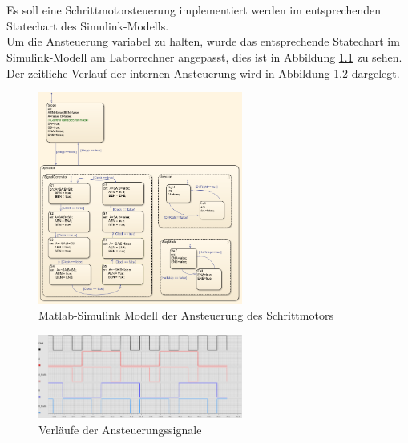 \chapter{}\label{ch:aufg6}

Es soll eine Schrittmotorsteuerung implementiert werden im entsprechenden Statechart des Simulink-Modells. \\
Um die Ansteuerung variabel zu halten, wurde das entsprechende Statechart im Simulink-Modell am Laborrechner angepasst, dies ist in Abbildung \ref{fig:6:simulink} zu sehen. Der zeitliche Verlauf der internen Ansteuerung wird in Abbildung \ref{fig:6:messung} dargelegt.

\begin{figure}[h]
	\centering
	\includegraphics[width=0.6\textwidth]{./Bilder/2.png}
	\caption{Matlab-Simulink Modell der Ansteuerung des Schrittmotors}
	\label{fig:6:simulink}
\end{figure}


\begin{figure}[h]
	\centering
	\includegraphics[width=0.6\textwidth]{./Bilder/1.png}
	\caption{Verläufe der Ansteuerungssignale}
	\label{fig:6:messung}
\end{figure}